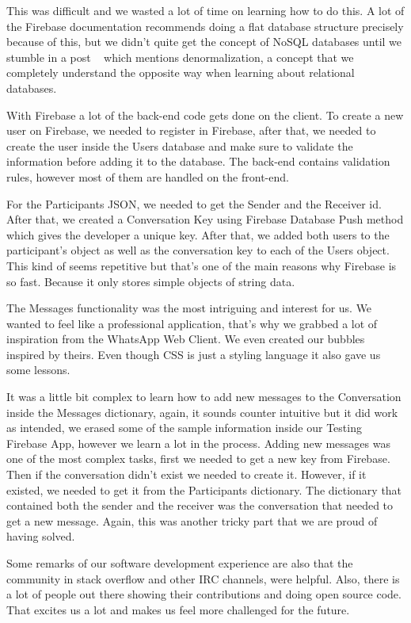 This was difficult and we wasted a lot of time on learning how to do this. A lot of the Firebase documentation recommends doing a flat database structure precisely because of this, but we didn't quite get the concept of NoSQL databases until we stumble in a post  ~\cite{tutyuty}  which mentions denormalization, a concept that we completely understand the opposite way when learning about relational databases.

With Firebase a lot of the back-end code gets done on the client. To create a new user on Firebase, we needed to register in Firebase, after that, we needed to create the user inside the Users database and make sure to validate the information before adding it to the database. The back-end contains validation rules, however most of them are handled on the front-end. 

For the Participants JSON, we needed to get the Sender and the Receiver id. After that, we created a Conversation Key using Firebase Database Push method which gives the developer a unique key. After that, we added both users to the participant’s object as well as the conversation key to each of the Users object. This kind of seems repetitive but that’s one of the main reasons why Firebase is so fast. Because it only stores simple objects of string data.

The Messages functionality was the most intriguing and interest for us. We wanted to feel like a professional application, that's why we grabbed a lot of inspiration from the WhatsApp Web Client. We even created our bubbles inspired by theirs. Even though CSS is just a styling language it also gave us some lessons.  

It was a little bit complex to learn how to add new messages to the Conversation inside the Messages dictionary, again, it sounds counter intuitive but it did work as intended, we erased some of the sample information inside our Testing Firebase App, however we learn a lot in the process. Adding new messages was one of the most complex tasks, first we needed to get a new key from Firebase. Then if the conversation didn't exist we needed to create it. However, if it existed, we needed to get it from the Participants dictionary. The dictionary that contained both the sender and the receiver was the conversation that needed to get a new message. Again, this was another tricky part that we are proud of having solved.

Some remarks of our software development experience are also that the community in stack overflow and other IRC channels, were helpful. Also, there is a lot of people out there showing their contributions and doing open source code. That excites us a lot and makes us feel more challenged for the future.

